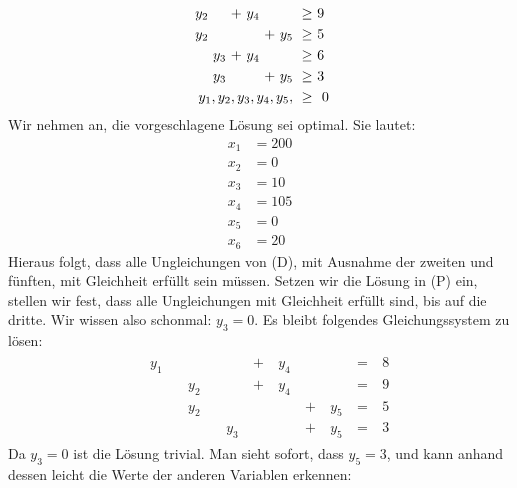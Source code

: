 \documentclass [a4paper,11pt]{article}
\begin{document}
\begin{enumerate}
\begin{enumerate}
\begin{align*}
\begin{alignedat}{10}
                    &&  & &\ y_2 & & &\ + &\ y_4 & & &\ \geq &\ 9\ \\
                    &&  & &\ y_2 & & & & &\ + &\ y_5 &\ \geq &\ 5\ \\
                    && & & & &\ y_3 &\ + &\ y_4 & & &\ \geq &\ 6\ \\
                    && & & & &\ y_3 & & &\ + &\ y_5 &\ \geq &\ 3\ \\
                    && & & & & & & & & \llap{$y_1,y_2,y_3,y_4,y_5,$} &\ \geq &\ 0
                    \end{alignedat}
                    \end{align*}
                    Wir nehmen an, die vorgeschlagene Lösung sei optimal. Sie lautet:
                    \begin{align*}
                        x_1 &= 200\\
                        x_2 &= 0\\
                        x_3 &= 10\\
                        x_4 &= 105\\
                        x_5 &= 0\\
                        x_6 &= 20
                    \end{align*}
                    Hieraus folgt, dass alle Ungleichungen von (D), mit Ausnahme der zweiten und fünften, mit Gleichheit erfüllt sein müssen. Setzen wir die
                    Lösung in (P) ein, stellen wir fest, dass alle Ungleichungen mit Gleichheit erfüllt sind, bis auf die dritte. Wir wissen also schonmal:
                    $y_3 = 0$. Es bleibt folgendes Gleichungssystem zu lösen:
                    \begin{align*}
                    \begin{alignedat}{10}
                    && y_1 &    &     & & &\ + &\ y_4 & & &\ = &\ 8\ \\
                    &&     &    &\ y_2 & & &\ + &\ y_4 & & &\ = &\ 9\ \\
                    &&     &    &\ y_2 & & & & &\ + &\ y_5 &\ = &\ 5\ \\
                    &&     &    & & &\ y_3 & & &\ + &\ y_5 &\ = &\ 3\ 
                    \end{alignedat}
                    \end{align*}
                    Da $y_3 = 0$ ist die Lösung trivial. Man sieht sofort, dass $y_5 = 3$, und kann anhand dessen leicht die Werte der anderen Variablen erkennen:
                    \begin{align*}

\end{align*}
\end{enumerate}
\end{enumerate}
\end{document}
